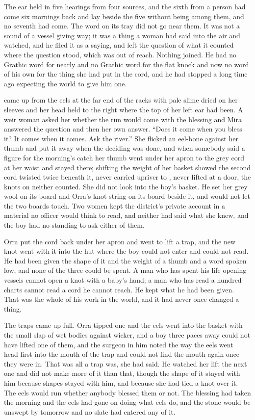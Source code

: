 The ear held  in five hearings from four sources, and the sixth from a person had come six mornings back and lay beside the five without being among them, and no seventh had come. The word on its tray did not go near them. It was not a sound of a vessel giving way; it was a thing a woman had said into the air and watched, and he filed it as a saying, and left the question of what it counted where the question stood, which was out of reach. Nothing joined. He had no Grathic word for nearly and no Grathic word for the flat knock and now no word of his own for the thing she had put in the cord, and he had stopped a long time ago expecting the world to give him one.

 came up from the eels at the far end of the racks with pale slime dried on her sleeves and her head held to the right where the top of her left ear had been. A weir woman asked her whether the run would come with the blessing and Mira answered the question and then her own answer. “Does it come when you bless it? It comes when it comes. Ask the river.” She flicked an eel-bone against her thumb and put it away when the deciding was done, and when somebody said a figure for the morning's catch her thumb went under her apron to the grey cord at her waist and stayed there; shifting the weight of her basket showed the second cord twisted twice beneath it, never carried upriver to , never lifted at a door, the knots on neither counted. She did not look into the boy's basket. He set her grey wool on its board and Orra's knot-string on its board beside it, and would not let the two boards touch. Two women kept the district's private account in a material no officer would think to read, and neither had said what she knew, and the boy had no standing to ask either of them.

Orra put the cord back under her apron and went to lift a trap, and the new knot went with it into the hut where the boy could not enter and could not read. He had been given the shape of it and the weight of a thumb and a word spoken low, and none of the three could be spent. A man who has spent his life opening vessels cannot open a knot with a baby's hand; a man who has read a hundred charts cannot read a cord he cannot reach. He kept what he had been given. That was the whole of his work in the world, and it had never once changed a thing.

\scenebreak

The traps came up full. Orra tipped one and the eels went into the basket with the small slap of wet bodies against wicker, and a boy three paces away could not have lifted one of them, and the surgeon in him noted the way the eels went head-first into the mouth of the trap and could not find the mouth again once they were in. That was all a trap was, she had said. He watched her lift the next one and did not make more of it than that, though the shape of it stayed with him because shapes stayed with him, and because she had tied a knot over it. The eels would run whether anybody blessed them or not. The blessing had taken the morning and the eels had gone on doing what eels do, and the stone would be unswept by tomorrow and no slate had entered any of it.

